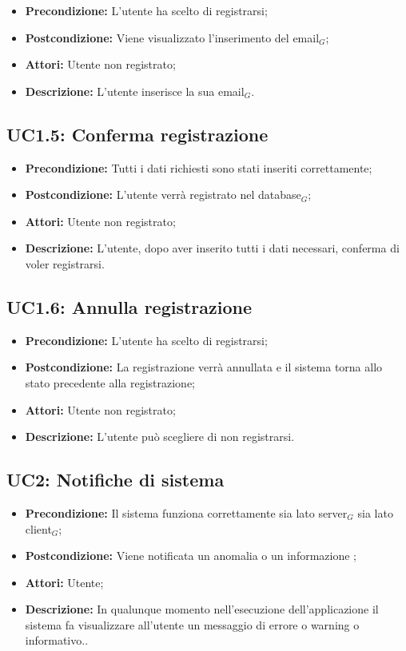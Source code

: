 \begin{itemize}
	\item \textbf{Precondizione:} L'utente ha scelto di registrarsi;
	\item \textbf{Postcondizione:} Viene visualizzato l'inserimento del email$_G$;
	\item \textbf{Attori:} Utente non registrato;
	\item \textbf{Descrizione:} L'utente inserisce la sua email$_G$.
\end{itemize}
\subsection{ UC1.5: Conferma registrazione}

\begin{itemize}
	\item \textbf{Precondizione:} Tutti i dati richiesti sono stati inseriti correttamente;
	\item \textbf{Postcondizione:} L'utente verrà registrato nel database$_G$;
	\item \textbf{Attori:} Utente non registrato;
	\item \textbf{Descrizione:} L'utente, dopo aver inserito tutti i dati necessari,  conferma di voler registrarsi.
\end{itemize}
\subsection{ UC1.6: Annulla registrazione}

\begin{itemize}
	\item \textbf{Precondizione:} L'utente ha scelto di registrarsi;
	\item \textbf{Postcondizione:} La registrazione verrà annullata e il sistema torna allo stato precedente alla registrazione;
	\item \textbf{Attori:} Utente non registrato;
	\item \textbf{Descrizione:} L'utente può scegliere di non registrarsi.
\end{itemize}
\subsection{ UC2: Notifiche di sistema}

\begin{itemize}
	\item \textbf{Precondizione:} Il sistema funziona correttamente sia lato server$_G$ sia lato client$_G$;
	\item \textbf{Postcondizione:} Viene notificata un anomalia o un informazione ;
	\item \textbf{Attori:} Utente;
	\item \textbf{Descrizione:} In qualunque momento nell'esecuzione dell'applicazione il sistema fa visualizzare all'utente un messaggio di errore o warning o informativo..
\end{itemize}
